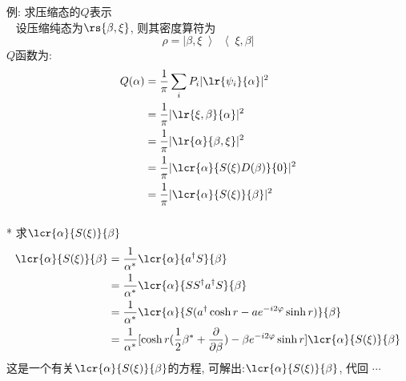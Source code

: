   \begin{frame} 
    \frametitle{}
       例: 求压缩态的$Q$表示 \\ 
       \解~ 设压缩纯态为$\rs{\beta,\xi}$, 则其密度算符为
       \[ \rho = |\beta,\xi \left\rangle \right\langle \xi, \beta |\]
       $Q$函数为:
       \[ \begin{aligned}
        Q(\alpha) &= \frac{1}{\pi} \sum_i P_i |\lr{\psi_i}{\alpha}|^2 \\ 
        &= \frac{1}{\pi}|\lr{\xi, \beta}{\alpha}|^2 \\ 
        &= \frac{1}{\pi}|\lr{\alpha}{\beta, \xi}|^2 \\
        &= \frac{1}{\pi}|\lcr{\alpha}{S(\xi)D(\beta)}{0}|^2 \\
        &= \frac{1}{\pi}|\lcr{\alpha}{S(\xi)}{\beta}|^2 
        \end{aligned}\] 
    \end{frame}

    \begin{frame} 
    \frametitle{}
    * 求$\lcr{\alpha}{ S(\xi) }{\beta}$\\ 
    \[ \begin{aligned}
      \lcr{\alpha}{S(\xi)}{\beta} &= \frac{1}{\alpha^*}\lcr{\alpha}{ a^{\dagger} S}{\beta} \\ 
      &= \frac{1}{\alpha^*}\lcr{\alpha}{ S S^{\dagger} a^{\dagger} S}{\beta} \\ 
      &= \frac{1}{\alpha^*}\lcr{\alpha}{ S (a^{\dagger} \cosh r- a e ^{-i2\varphi} \sinh r )}{\beta} \\
      &= \frac{1}{\alpha^*} [\cosh r(\frac{1}{2}\beta^* + \frac{\partial }{\partial \beta}) - \beta e ^{-i2\varphi} \sinh r ] \lcr{\alpha}{ S(\xi) }{\beta}
      \end{aligned}\]  
      这是一个有关$\lcr{\alpha}{ S(\xi) }{\beta}$的方程, 可解出:$\lcr{\alpha}{ S(\xi) }{\beta}$, 代回 $\cdots $
    \end{frame}

